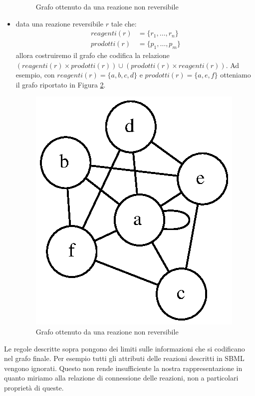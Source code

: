 \begin{itemize}
\begin{figure}
    \caption{Grafo ottenuto da una reazione non reversibile}
    \label{fig:non-reversible-reaction-mapping}
  \end{figure}
\item data una reazione reversibile $r$ tale che:
  \begin{displaymath}
    \begin{split} 
      reagenti(r) &= \{ r_{1}, \ldots, r_{n} \} \\
      prodotti(r) &= \{ p_{1}, \ldots, p_{m} \}
    \end{split}
  \end{displaymath}
  allora costruiremo il grafo che codifica la relazione $(reagenti(r)
  \times prodotti(r)) \cup (prodotti(r) \times reagenti(r))$. Ad
  esempio, con $reagenti(r) = \{ a, b, c, d \}$ e $prodotti(r) = \{a,
  e, f\}$ otteniamo il grafo riportato in Figura
  \ref{fig:reversible-reaction-mapping}.
  \begin{figure}
    \centering
    \includegraphics{images/reversible-reaction-example.dot.eps}
    \caption{Grafo ottenuto da una reazione non reversibile}
    \label{fig:reversible-reaction-mapping}
  \end{figure}
\end{itemize}
Le regole descritte sopra pongono dei limiti sulle informazioni che si
codificano nel grafo finale. Per esempio tutti gli attributi delle
reazioni descritti in SBML vengono ignorati. Questo non rende
insufficiente la nostra rappresentazione in quanto miriamo alla
relazione di connessione delle reazioni, non a particolari propriet\`a
di queste.

